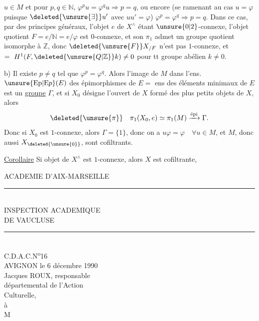 $u\in M$ et pour $p,q\in\mathbb N$, $\varphi^pu=\varphi^qu\Longrightarrow p=q$,
ou encore  (se ramenant au cas $u=\varphi$
puisque $\deleted{\unsure{\exists}}u'$ avec $uu'=\varphi$) $\varphi^p=\varphi^q\Longrightarrow p=q$.
Dans ce cas, par des principes généraux,
 l'objet $e$ de $X^\wedge$ étant $\unsure{0|2}$-connexe,
l'objet quotient $F=e/\mathbb N=e/\varphi$ est $0$-connexe,
et son $\pi_1$ admet un groupe quotient isomorphe
à $\mathbb Z$, donc $\deleted{\unsure{F}}X_{/F}$ n'est pas $1$-connexe,
et $=\ H^1(F,\deleted{\unsure{Q|\mathbb Z}}k)\ne0$ pour tt groupe
abélien $k\ne0$.

b) Il existe $p\ne q$ tel que $\varphi^p=\varphi^q$. Alors
 l'image de $M$ dans l'ens.
$\unsure{\mathrm{Ep}|\mathrm{E}p}(E)$ des épimorphismes de $E=$ ens des
éléments minimaux de $E$ est un \uline{groupe}
$\Gamma$, et si $X_0$ désigne l'ouvert de $X$
formé des plus petits objets de $X$, alors
\[
\deleted{\unsure{\pi}}\quad \pi_1(X_0,e)\simeq\pi_1(M)\xrightarrow{\text{épi}}\Gamma.
\]
Donc si $X_0$ est $1$-connexe, alors $\Gamma=\{1\}$, donc
on a $u\varphi=\varphi\quad\forall u\in M$, et $M$,  donc
aussi $X_{\deleted{\unsure{0}}}$,  sont cofiltrants. 

\uline{Corollaire} Si  objet de $X^\wedge$ est $1$-connexe,
alors $X$ est cofiltrante,


ACADEMIE D'AIX-MARSEILLE\\
\rule{2cm}{0.4pt}\\
INSPECTION ACADEMIQUE\\
DE VAUCLUSE\\
\rule{0.9cm}{0.4pt}\\

C.D.A.C.N\textsuperscript{o}16\\

AVIGNON le 6 décembre 1990\\

Jacques ROUX, responsable\\
départemental de l'Action\\
Culturelle,\\

à\\
M\\

